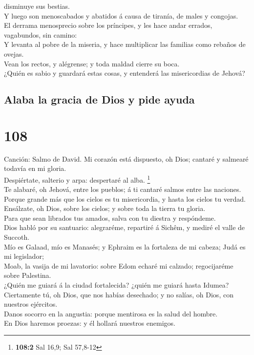 disminuye sus bestias.\\
 Y luego son menoscabados y abatidos á causa de tiranía,
de males y congojas.\\
 El derrama menosprecio sobre los príncipes, y les hace
andar errados, vagabundos, sin camino:\\
 Y levanta al pobre de la miseria, y hace multiplicar las
familias como rebaños de ovejas.\\
 Vean los rectos, y alégrense; y toda maldad cierre su
boca.\\
 ¿Quién es sabio y guardará estas cosas, y entenderá las
misericordias de Jehová?

\hypertarget{alaba-la-gracia-de-dios-y-pide-ayuda}{%
\subsection{Alaba la gracia de Dios y pide
ayuda}\label{alaba-la-gracia-de-dios-y-pide-ayuda}}

\hypertarget{section-107}{%
\section{108}\label{section-107}}

 Canción: Salmo de David. Mi corazón está dispuesto, oh
Dios; cantaré y salmearé todavía en mi gloria.\\
 Despiértate, salterio y arpa: despertaré al alba.
\footnote{\textbf{108:2} Sal 16,9; Sal 57,8-12}\\
 Te alabaré, oh Jehová, entre los pueblos; á ti cantaré
salmos entre las naciones.\\
 Porque grande más que los cielos es tu misericordia, y
hasta los cielos tu verdad.\\
 Ensálzate, oh Dios, sobre los cielos; y sobre toda la
tierra tu gloria.\\
 Para que sean librados tus amados, salva con tu diestra y
respóndeme.\\
 Dios habló por su santuario: alegraréme, repartiré á
Sichêm, y mediré el valle de Succoth.\\
 Mío es Galaad, mío es Manasés; y Ephraim es la fortaleza
de mi cabeza; Judá es mi legislador;\\
 Moab, la vasija de mi lavatorio: sobre Edom echaré mi
calzado; regocijaréme sobre Palestina.\\
 ¿Quién me guiará á la ciudad fortalecida? ¿quién me
guiará hasta Idumea?\\
 Ciertamente tú, oh Dios, que nos habías desechado; y no
salías, oh Dios, con nuestros ejércitos.\\
 Danos socorro en la angustia: porque mentirosa es la
salud del hombre.\\
 En Dios haremos proezas: y él hollará nuestros enemigos.

